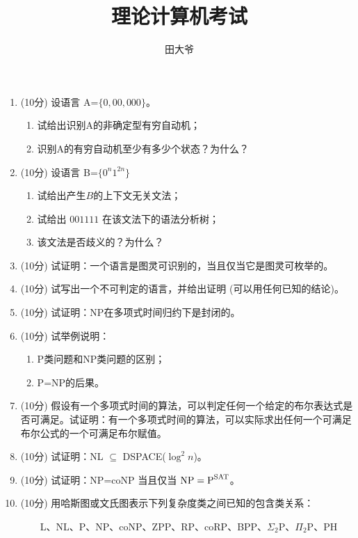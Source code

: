 \documentclass[a4paper]{article}
\begin{document}
	\begin{CJK*}{GBK}{song}
	\title{理论计算机考试}
	\author{田大爷}
		\maketitle
	\begin{enumerate}
		\setlength{\itemsep}{20pt}
		\setlength{\parskip}{10pt}
		\item (10分) 设语言 A=$\{0,00,000\}$。
		\begin{enumerate}[(1)]
			\item 试给出识别A的非确定型有穷自动机；
			\item 识别A的有穷自动机至少有多少个状态？为什么？
		\end{enumerate}
		\item (10分) 设语言 B=$\{0^n1^{2n}\}$
		\begin{enumerate}[(1)]
			\item 试给出产生$B$的上下文无关文法；
			\item 试给出 $001111$ 在该文法下的语法分析树；
			\item 该文法是否歧义的？为什么？
		\end{enumerate}
		\item (10分) 试证明：一个语言是图灵可识别的，当且仅当它是图灵可枚举的。
		\item (10分) 试写出一个不可判定的语言，并给出证明 (可以用任何已知的结论)。
		\item (10分) 试证明：NP在多项式时间归约下是封闭的。
		\item (10分)	试举例说明：
		\begin{enumerate}[(1)]
			\item P类问题和NP类问题的区别；
			\item P=NP的后果。
		\end{enumerate}
		\item (10分) 假设有一个多项式时间的算法，可以判定任何一个给定的布尔表达式是否可满足。试证明：有一个多项式时间的算法，可以实际求出任何一个可满足布尔公式的一个可满足布尔赋值。
		\item (10分) 试证明：NL $\subseteq$ DSPACE($\log^2n$)。
		\item (10分) 试证明：NP=coNP 当且仅当 ${\text{NP}=\text P^\text{SAT}}$。
		\item (10分)	用哈斯图或文氏图表示下列复杂度类之间已知的包含类关系：
		
	\ \ \ \	L、NL、P、NP、coNP、ZPP、RP、coRP、BPP、$\Sigma_2$P、$\Pi_2$P、PH
	\end{enumerate}
	\end{CJK*}
\end{document}
